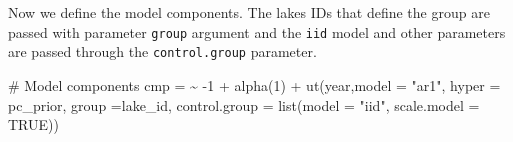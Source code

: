 \documentclass[
  letterpaper,
  DIV=11,
  numbers=noendperiod]{scrartcl}
\newenvironment{Shaded}{\begin{snugshade}}{\end{snugshade}}
\newcommand{\AttributeTok}[1]{\textcolor[rgb]{0.40,0.45,0.13}{#1}}
\newcommand{\CommentTok}[1]{\textcolor[rgb]{0.37,0.37,0.37}{#1}}
\newcommand{\ConstantTok}[1]{\textcolor[rgb]{0.56,0.35,0.01}{#1}}
\newcommand{\DecValTok}[1]{\textcolor[rgb]{0.68,0.00,0.00}{#1}}
\newcommand{\ErrorTok}[1]{\textcolor[rgb]{0.68,0.00,0.00}{#1}}
\newcommand{\FloatTok}[1]{\textcolor[rgb]{0.68,0.00,0.00}{#1}}
\newcommand{\FunctionTok}[1]{\textcolor[rgb]{0.28,0.35,0.67}{#1}}
\newcommand{\NormalTok}[1]{\textcolor[rgb]{0.00,0.23,0.31}{#1}}
\newcommand{\OtherTok}[1]{\textcolor[rgb]{0.00,0.23,0.31}{#1}}
\newcommand{\SpecialCharTok}[1]{\textcolor[rgb]{0.37,0.37,0.37}{#1}}
\newcommand{\StringTok}[1]{\textcolor[rgb]{0.13,0.47,0.30}{#1}}
\begin{document}
\begin{Shaded}
\end{Shaded}

Now we define the model components. The lakes IDs that define the group
are passed with parameter \texttt{group} argument and the \texttt{iid}
model and other parameters are passed through the \texttt{control.group}
parameter.

\begin{Shaded}
\begin{Highlighting}[]
\CommentTok{\# Model components}
\NormalTok{cmp }\OtherTok{=}  \ErrorTok{\textasciitilde{}} \SpecialCharTok{{-}}\DecValTok{1} \SpecialCharTok{+} \FunctionTok{alpha}\NormalTok{(}\DecValTok{1}\NormalTok{) }\SpecialCharTok{+} \FunctionTok{ut}\NormalTok{(year,}\AttributeTok{model =} \StringTok{"ar1"}\NormalTok{,}
                            \AttributeTok{hyper =}\NormalTok{ pc\_prior,}
                            \AttributeTok{group =}\NormalTok{lake\_id,}
                            \AttributeTok{control.group =} 
                            \FunctionTok{list}\NormalTok{(}\AttributeTok{model =} \StringTok{"iid"}\NormalTok{, }
                                 \AttributeTok{scale.model =} \ConstantTok{TRUE}\NormalTok{))}
\end{Highlighting}
\end{Shaded}
\end{document}
